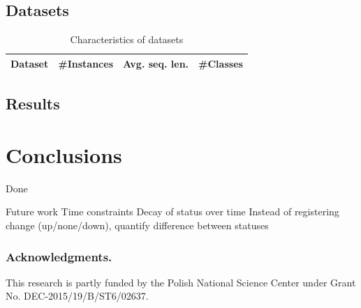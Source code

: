 \documentclass[runningheads,a4paper]{llncs}
\begin{document}
\subsection{Datasets}

\begin{table}[htbp]
	\scriptsize
  \centering
  \caption{Characteristics of datasets}
    \begin{tabularx}{\textwidth}{l@{}R@{}R@{}R@{}}
		\toprule
    Dataset  & \#Instances & Avg. seq. len. & \#Classes \\
		\midrule

    \bottomrule
    \end{tabularx}%
  \label{tab:datasets}%
\end{table}%

\subsection{Results}

\section{Conclusions}
\label{sec:conclusions}
Done

Future work
Time constraints
Decay of status over time
Instead of registering change (up/none/down), quantify difference between statuses

\subsubsection*{Acknowledgments.} This research is partly funded by the Polish National Science Center under Grant No. DEC-2015/19/B/ST6/02637.



\end{document}
